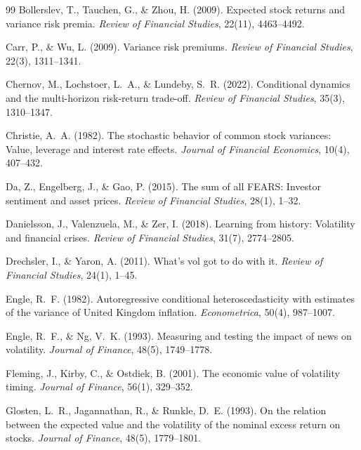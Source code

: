 \documentclass[12pt,a4paper]{article}
\begin{document}
\begin{thebibliography}{99}
Bollerslev, T., Tauchen, G., \& Zhou, H. (2009). Expected stock returns and variance risk premia. \textit{Review of Financial Studies}, 22(11), 4463--4492.

Carr, P., \& Wu, L. (2009). Variance risk premiums. \textit{Review of Financial Studies}, 22(3), 1311--1341.

Chernov, M., Lochstoer, L.~A., \& Lundeby, S.~R. (2022). Conditional dynamics and the multi-horizon risk-return trade-off. \textit{Review of Financial Studies}, 35(3), 1310--1347.

Christie, A.~A. (1982). The stochastic behavior of common stock variances: Value, leverage and interest rate effects. \textit{Journal of Financial Economics}, 10(4), 407--432.

Da, Z., Engelberg, J., \& Gao, P. (2015). The sum of all FEARS: Investor sentiment and asset prices. \textit{Review of Financial Studies}, 28(1), 1--32.

Danielsson, J., Valenzuela, M., \& Zer, I. (2018). Learning from history: Volatility and financial crises. \textit{Review of Financial Studies}, 31(7), 2774--2805.

Drechsler, I., \& Yaron, A. (2011). What's vol got to do with it. \textit{Review of Financial Studies}, 24(1), 1--45.

Engle, R.~F. (1982). Autoregressive conditional heteroscedasticity with estimates of the variance of United Kingdom inflation. \textit{Econometrica}, 50(4), 987--1007.

Engle, R.~F., \& Ng, V.~K. (1993). Measuring and testing the impact of news on volatility. \textit{Journal of Finance}, 48(5), 1749--1778.

Fleming, J., Kirby, C., \& Ostdiek, B. (2001). The economic value of volatility timing. \textit{Journal of Finance}, 56(1), 329--352.

Glosten, L.~R., Jagannathan, R., \& Runkle, D.~E. (1993). On the relation between the expected value and the volatility of the nominal excess return on stocks. \textit{Journal of Finance}, 48(5), 1779--1801.


\end{thebibliography}
\end{document}
